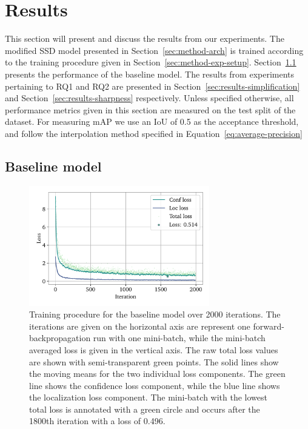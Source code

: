 \chapter{Results}\label{cha:results}

This section will present and discuss the results from our experiments.
The modified SSD model presented in Section~\ref{sec:method-arch} is trained according to the training procedure given in Section~\ref{sec:method-exp-setup}.
Section~\ref{sec:results-baseline} presents the performance of the baseline model. 
The results from experiments pertaining to RQ1 and RQ2 are presented in Section~\ref{sec:results-simplification} and Section~\ref{sec:results-sharpness} respectively.
Unless specified otherwise, all performance metrics given in this section are measured on the test split of the dataset.
For measuring mAP we use an IoU of 0.5 as the acceptance threshold, and follow the interpolation method specified in Equation~\ref{eq:average-precision}

\section{Baseline model}\label{sec:results-baseline}
\begin{figure}[htb]
    \centering
    \includegraphics[width=0.7\textwidth]{figs/method/baseline/loss2.pdf}
    \caption[Baseline training procedure]{%
Training procedure for the baseline model over 2000 iterations.
The iterations are given on the horizontal axis are represent one forward-backpropagation run with one mini-batch, while the mini-batch averaged loss is given in the vertical axis.
The raw total loss values are shown with semi-transparent green points.
The solid lines show the moving means for the two individual loss components.
The green line shows the confidence loss component, while the blue line shows the localization loss component.
The mini-batch with the lowest total loss is annotated with a green circle and occurs after the 1800th iteration with a loss of 0.496.
    }\label{fig:method-baseline-loss}
  \end{figure}

